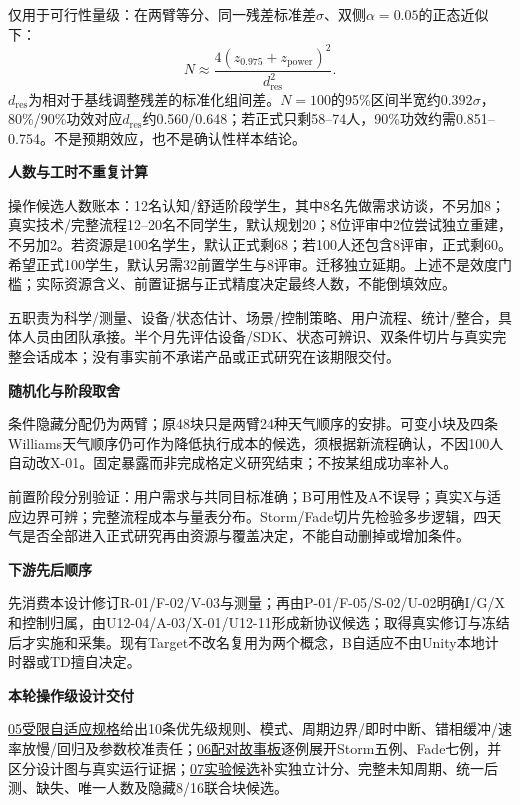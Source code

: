 \documentclass[11pt,a4paper]{article}
\newcommand{\reviewsubsection}[1]{\par\Needspace{4\baselineskip}\vspace{4pt}\begin{center}{\titlelatin\titlecjk\bfseries\fontsize{12}{18}\selectfont #1}\end{center}}
\begin{document}
仅用于可行性量级：在两臂等分、同一残差标准差$\sigma$、双侧$\alpha=0.05$的正态近似下：
\[
N\approx\frac{4(z_{0.975}+z_{\mathrm{power}})^2}{d_{\mathrm{res}}^2}.
\]
$d_{\mathrm{res}}$为相对于基线调整残差的标准化组间差。$N=100$的95\%区间半宽约$0.392\sigma$，80\%/90\%功效对应$d_{\mathrm{res}}$约0.560/0.648；若正式只剩58--74人，90\%功效约需0.851--0.754。不是预期效应，也不是确认性样本结论。


\reviewsubsection{7.2 人数与工时不重复计算}
操作候选人数账本：12名认知/\allowbreak{}舒适阶段学生，其中8名先做需求访谈，不另加8；真实技术/\allowbreak{}完整流程12–20名不同学生，默认规划20；8位评审中2位尝试独立重建，不另加2。若资源是100名学生，默认正式剩68；若100人还包含8评审，正式剩60。希望正式100学生，默认另需32前置学生与8评审。迁移独立延期。上述不是效度门槛；实际资源含义、前置证据与正式精度决定最终人数，不能倒填效应。


五职责为科学/\allowbreak{}测量、设备/\allowbreak{}状态估计、场景/\allowbreak{}控制策略、用户流程、统计/\allowbreak{}整合，具体人员由团队承接。半个月先评估设备/\allowbreak{}SDK、状态可辨识、双条件切片与真实完整会话成本；没有事实前不承诺产品或正式研究在该期限交付。


\reviewsubsection{7.3 随机化与阶段取舍}
条件隐藏分配仍为两臂；原48块只是两臂24种天气顺序的安排。可变小块及四条Williams天气顺序仍可作为降低执行成本的候选，须根据新流程确认，不因100人自动改X-\allowbreak{}01。固定暴露而非完成格定义研究结束；不按某组成功率补人。


前置阶段分别验证：用户需求与共同目标准确；B可用性及A不误导；真实X与适应边界可辨；完整流程成本与量表分布。Storm/\allowbreak{}Fade切片先检验多步逻辑，四天气是否全部进入正式研究再由资源与覆盖决定，不能自动删掉或增加条件。


\reviewsubsection{7.4 下游先后顺序}
先消费本设计修订R-\allowbreak{}01/\allowbreak{}F-\allowbreak{}02/\allowbreak{}V-\allowbreak{}03与测量；再由P-\allowbreak{}01/\allowbreak{}F-\allowbreak{}05/\allowbreak{}S-\allowbreak{}02/\allowbreak{}U-\allowbreak{}02明确I/\allowbreak{}G/\allowbreak{}X和控制归属，由U12-\allowbreak{}04/\allowbreak{}A-\allowbreak{}03/\allowbreak{}X-\allowbreak{}01/\allowbreak{}U12-\allowbreak{}11形成新协议候选；取得真实修订与冻结后才实施和采集。现有Target不改名复用为两个概念，B自适应不由Unity本地计时器或TD擅自决定。





\reviewsubsection{7.5 本轮操作级设计交付}
\href{05-control-spec.pdf}{05受限自适应规格}给出10条优先级规则、模式、周期边界/即时中断、错相缓冲/速率放慢/回归及参数校准责任；\href{06-paired-storyboards.pdf}{06配对故事板}逐例展开Storm五例、Fade七例，并区分设计图与真实运行证据；\href{07-protocol-candidate.pdf}{07实验候选}补实独立计分、完整未知周期、统一后测、缺失、唯一人数及隐藏8/16联合块候选。
\end{document}
